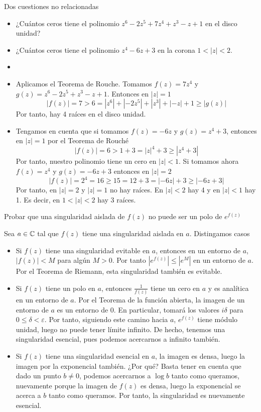 \documentclass[twoside]{article}
\begin{document}
\begin{ejercicio}{2}
Dos cuestiones no relacionadas
\begin{itemize}
\item ¿Cuántos ceros tiene el polinomio $z^6-2z^5 +7z^4+z^3-z+1$ en el disco unidad?
\item ¿Cuántos ceros tiene el polinomio $z^4-6z+3$ en la corona $1<|z|<2$.
\end{itemize}
\end{ejercicio}
\begin{solucion}
\begin{itemize}
\item[]
\item Aplicamos el Teorema de Rouche. Tomamos $f(z)=7z^4$ y $g(z)=z^6-2z^5+z^3-z+1$. Entonces en $|z|=1$
$$
|f(z)| = 7 > 6 = |z^6| + |-2z^5| + |z^3| + |-z| +1 \geq |g(z)|
$$
Por tanto, hay 4 raíces en el disco unidad.
\item  Tengamos en cuenta que si tomamos $f(z)=-6z$ y $g(z)=z^4+3$, entonces en $|z|=1$ por el Teorema de Rouché
$$
|f(z)| = 6 > 1+3 = |z|^4+ 3 \geq |z^4+3|
$$
Por tanto, nuestro polinomio tiene un cero en $|z|<1$. Si tomamos ahora $f(z)=z^4$ y $g(z)=-6z+3$ entonces en $|z|=2$
$$
|f(z)| = 2^4 = 16 \geq 15 = 12 + 3 = |-6z| + 3 \geq |-6z+3|
$$
Por tanto, en $|z|=2$ y $|z|=1$ no hay raíces. En $|z|<2$ hay 4 y en $|z|<1$ hay 1. Es decir, en $1<|z|<2$ hay 3 raíces.
\end{itemize}
\end{solucion}
\newpage

\begin{ejercicio}{3}
Probar que una singularidad aislada de $f(z)$ no puede ser un polo de $e^{f(z)}$ 
\end{ejercicio}
\begin{solucion}
Sea $a\in \mathbb{C}$ tal que $f(z)$ tiene una singularidad aislada en $a$. Distingamos casos
\begin{itemize}
\item Si $f(z)$ tiene una singularidad evitable en $a$, entonces en un entorno de $a$, $|f(z)|<M$ para algún $M>0$. Por tanto $|e^{f(z)}| \leq |e^M|$ en un entorno de $a$. Por el Teorema de Riemann, esta singularidad también es evitable.
\item Si $f(z)$ tiene un polo en $a$, entonces $\frac{1}{f(z)}$ tiene un cero en $a$ y es analítica en un entorno de $a$. Por el Teorema de la función abierta, la imagen de un entorno de $a$ es un entorno de $0$. En particular, tomará los valores $i\delta$ para $0\leq \delta < \varepsilon$. Por tanto, siguiendo este camino hacia $a$, $e^{f(z)}$ tiene módulo unidad, luego no puede tener límite infinito. De hecho, tenemos una singularidad esencial, pues podemos acercarnos a infinito también.
\item Si $f(z)$ tiene una singularidad esencial en $a$, la imagen es densa, luego la imagen por la exponencial también. ¿Por qué? Basta tener en cuenta que dado un punto $b\neq 0$, podemos acercarnos a $\log b$ tanto como queramos, nuevamente porque la imagen de $f(z)$ es densa, luego la exponencial se acerca a $b$ tanto como queramos. Por tanto, la singularidad es nuevamente esencial.
\end{itemize} 
\end{solucion}
\newpage
\end{document}
